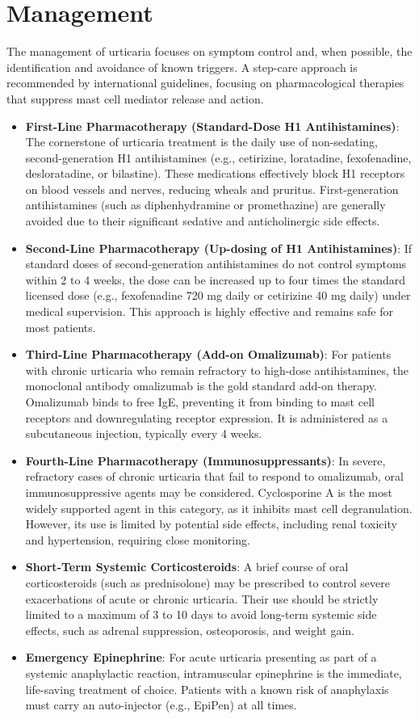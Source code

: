 \section*{Management}
The management of urticaria focuses on symptom control and, when possible, the identification and avoidance of known triggers. A step-care approach is recommended by international guidelines, focusing on pharmacological therapies that suppress mast cell mediator release and action.

\begin{itemize}
    \item \textbf{First-Line Pharmacotherapy (Standard-Dose H1 Antihistamines)}: The cornerstone of urticaria treatment is the daily use of non-sedating, second-generation H1 antihistamines (e.g., cetirizine, loratadine, fexofenadine, desloratadine, or bilastine). These medications effectively block H1 receptors on blood vessels and nerves, reducing wheals and pruritus. First-generation antihistamines (such as diphenhydramine or promethazine) are generally avoided due to their significant sedative and anticholinergic side effects.
    \item \textbf{Second-Line Pharmacotherapy (Up-dosing of H1 Antihistamines)}: If standard doses of second-generation antihistamines do not control symptoms within 2 to 4 weeks, the dose can be increased up to four times the standard licensed dose (e.g., fexofenadine 720 mg daily or cetirizine 40 mg daily) under medical supervision. This approach is highly effective and remains safe for most patients.
    \item \textbf{Third-Line Pharmacotherapy (Add-on Omalizumab)}: For patients with chronic urticaria who remain refractory to high-dose antihistamines, the monoclonal antibody omalizumab is the gold standard add-on therapy. Omalizumab binds to free IgE, preventing it from binding to mast cell receptors and downregulating receptor expression. It is administered as a subcutaneous injection, typically every 4 weeks.
    \item \textbf{Fourth-Line Pharmacotherapy (Immunosuppressants)}: In severe, refractory cases of chronic urticaria that fail to respond to omalizumab, oral immunosuppressive agents may be considered. Cyclosporine A is the most widely supported agent in this category, as it inhibits mast cell degranulation. However, its use is limited by potential side effects, including renal toxicity and hypertension, requiring close monitoring.
    \item \textbf{Short-Term Systemic Corticosteroids}: A brief course of oral corticosteroids (such as prednisolone) may be prescribed to control severe exacerbations of acute or chronic urticaria. Their use should be strictly limited to a maximum of 3 to 10 days to avoid long-term systemic side effects, such as adrenal suppression, osteoporosis, and weight gain.
    \item \textbf{Emergency Epinephrine}: For acute urticaria presenting as part of a systemic anaphylactic reaction, intramuscular epinephrine is the immediate, life-saving treatment of choice. Patients with a known risk of anaphylaxis must carry an auto-injector (e.g., EpiPen) at all times.
\end{itemize}

